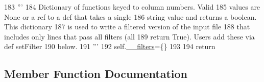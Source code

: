 \begin{DoxyCode}
183         \textcolor{stringliteral}{'''}
184 \textcolor{stringliteral}{        Dictionary of functions keyed to column numbers. Valid}
185 \textcolor{stringliteral}{        values are None or a ref to a def that takes a single }
186 \textcolor{stringliteral}{        string value and returns a boolean.  This dictionary }
187 \textcolor{stringliteral}{        is used to write a filtered version of the input file }
188 \textcolor{stringliteral}{        that includes only lines that pass all filters (all }
189 \textcolor{stringliteral}{        return True). Users add these via def setFilter}
190 \textcolor{stringliteral}{        below.}
191 \textcolor{stringliteral}{        '''}
192         self.\hyperlink{classnegui_1_1pgneestimationtablefilemanager_1_1NeEstimationTableFileManager_a3a7a1e43a9a60b8de5b2259fc4014ca4}{\_\_filters}=\{\}
193 
194         \textcolor{keywordflow}{return}
\end{DoxyCode}


\subsection{Member Function Documentation}
